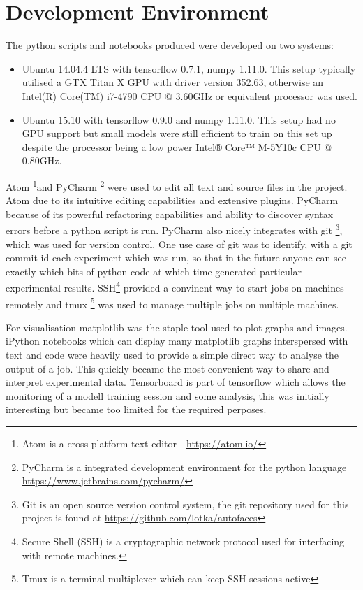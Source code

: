   \section{Development Environment}
    The python scripts and notebooks produced were developed on two systems:
    \begin{itemize}
      \item     Ubuntu 14.04.4 LTS with tensorflow 0.7.1, numpy 1.11.0. This setup typically utilised a GTX Titan X GPU with driver version 352.63, otherwise
                an Intel(R) Core(TM) i7-4790 CPU @ 3.60GHz or equivalent processor was used.
      \item     Ubuntu 15.10 with tensorflow 0.9.0 and numpy 1.11.0. This setup had no GPU support but small models were still efficient to train on this set up
                despite the processor being a low power Intel® Core™ M-5Y10c CPU @ 0.80GHz.
    \end{itemize}
    Atom \footnote{Atom is a cross platform text editor - \url{https://atom.io/}}and PyCharm \footnote{PyCharm is a integrated development environment for the python language \url{https://www.jetbrains.com/pycharm/}} were used to edit all text and source files in the project.
    Atom due to its intuitive editing capabilities and extensive plugins. PyCharm because
    of its powerful refactoring capabilities and ability to discover syntax errors before
    a python script is run. PyCharm also nicely integrates with git \footnote{Git is an open source version control system,
    the git repository used for this project is found at \url{https://github.com/lotka/autofaces}}, which was used for version control.
    One use case of git was to identify, with a git commit id each experiment which was run, so that in the future
    anyone can see exactly which bits of python code at which time generated particular experimental results.
    SSH\footnote{Secure Shell (SSH) is a cryptographic network protocol used for interfacing with remote machines.} provided a convinent way to start jobs on machines remotely and tmux \footnote{Tmux is a terminal
    multiplexer which can keep SSH sessions active} was used to manage multiple jobs on multiple machines.

    For visualisation matplotlib was the staple tool used to plot graphs and images. iPython notebooks
    which can display many matplotlib graphs interspersed with text and code were heavily used to
    provide a simple direct way to analyse the output of a job. This quickly became the most convenient way to
    share and interpret experimental data. Tensorboard is part of tensorflow which allows the monitoring of a
    modell training session and some analysis, this was initially interesting but became too limited for the required perposes.
